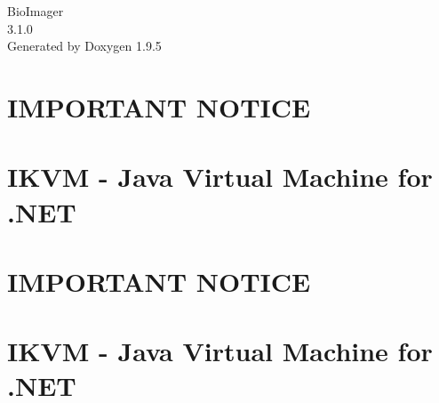 \documentclass[twoside]{book}
\newcommand{\+}{\discretionary{\mbox{\scriptsize$\hookleftarrow$}}{}{}}
\newcommand{\clearemptydoublepage}{%
    \newpage{\pagestyle{empty}\cleardoublepage}%
  }
\begin{document}
  \raggedbottom
    \hypersetup{pageanchor=false,
                bookmarksnumbered=true,
                pdfencoding=unicode
               }
  \begin{titlepage}
  \vspace*{7cm}
  \begin{center}%
  {\Large Bio\+Imager}\\
  [1ex]\large 3.\+1.\+0 \\
  \vspace*{1cm}
  {\large Generated by Doxygen 1.9.5}\\
  \end{center}
  \end{titlepage}
  \clearemptydoublepage
  \tableofcontents
  \clearemptydoublepage
  \hypersetup{pageanchor=true}
\chapter{IMPORTANT NOTICE}
\label{md_bin__debug_net6_0_windows_ikvm_linux_arm__l_i_c_e_n_s_e}

\chapter{IKVM -\/ Java Virtual Machine for .NET}
\label{md_bin__debug_net6_0_windows_ikvm_linux_arm__r_e_a_d_m_e}

\chapter{IMPORTANT NOTICE}
\label{md_bin__debug_net6_0_windows_ikvm_linux_arm64__l_i_c_e_n_s_e}

\chapter{IKVM -\/ Java Virtual Machine for .NET}
\label{md_bin__debug_net6_0_windows_ikvm_linux_arm64__r_e_a_d_m_e}

\end{document}
